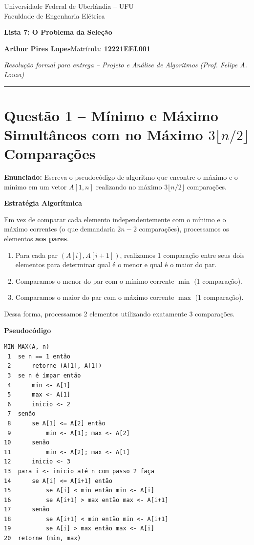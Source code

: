 \documentclass[11pt,a4paper]{article}
\newcommand{\topico}[1]{\par\medskip\textbf{\color{azul}#1}\par}
\newcommand{\questao}[2]{\section*{Questão #1 -- #2}}
\begin{document}
\begin{center}
  {\small Universidade Federal de Uberlândia -- UFU\\Faculdade de Engenharia Elétrica}\par
  \vspace{4pt}
  {\LARGE\bfseries\color{azul} Lista 7: O Problema da Seleção}\par
  \vspace{4pt}
  \textbf{Arthur Pires Lopes}\quad Matrícula: \textbf{12221EEL001}\par
  \textit{Resolução formal para entrega -- Projeto e Análise de Algoritmos (Prof. Felipe A. Louza)}
\end{center}
\hrule
\vspace{6pt}

\questao{1}{Mínimo e Máximo Simultâneos com no Máximo $3\lfloor n/2 \rfloor$ Comparações}

\textbf{Enunciado:} Escreva o pseudocódigo de algoritmo que encontre o máximo e o mínimo em um vetor $A[1, n]$ realizando no máximo $3\lfloor n/2 \rfloor$ comparações.

\topico{Estratégia Algorítmica}
Em vez de comparar cada elemento independentemente com o mínimo e o máximo correntes (o que demandaria $2n - 2$ comparações), processamos os elementos \textbf{aos pares}. 
\begin{enumerate}
    \item Para cada par $(A[i], A[i+1])$, realizamos 1 comparação entre seus dois elementos para determinar qual é o menor e qual é o maior do par.
    \item Comparamos o menor do par com o mínimo corrente $\min$ (1 comparação).
    \item Comparamos o maior do par com o máximo corrente $\max$ (1 comparação).
\end{enumerate}
Dessa forma, processamos 2 elementos utilizando exatamente $3$ comparações.

\topico{Pseudocódigo}
\begin{lstlisting}
MIN-MAX(A, n)
 1  se n == 1 então
 2      retorne (A[1], A[1])
 3  se n é ímpar então
 4      min <- A[1]
 5      max <- A[1]
 6      inicio <- 2
 7  senão
 8      se A[1] <= A[2] então
 9          min <- A[1]; max <- A[2]
10      senão
11          min <- A[2]; max <- A[1]
12      inicio <- 3
13  para i <- inicio até n com passo 2 faça
14      se A[i] <= A[i+1] então
15          se A[i] < min então min <- A[i]
16          se A[i+1] > max então max <- A[i+1]
17      senão
18          se A[i+1] < min então min <- A[i+1]
19          se A[i] > max então max <- A[i]
20  retorne (min, max)
\end{lstlisting}
\end{document}
